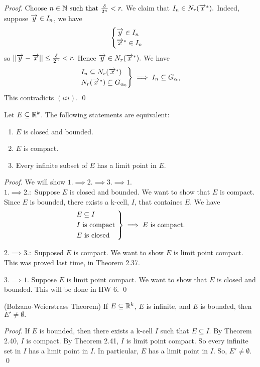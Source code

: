 \begin{proof}
		Choose $n\in \mathbb{N} \text{ such that } \frac{\delta}{2^n} < r.$ We claim that $I_n \in N_{r}(\overrightarrow{x}^*).$ Indeed,
		suppose $\overrightarrow{y}\in I_n$, we have $$\begin{cases}
			\overrightarrow{y}\in I_n \\
			\overrightarrow{x}^* \in I_n
		\end{cases}$$
		so $||\overrightarrow{y} - \overrightarrow{x}|| \leq \frac{\delta}{2^n} < r.$ Hence $\overrightarrow{y} \in N_{r}(\overrightarrow{x}^*).$ We have
		$$\begin{rcases}
			I_n \subseteq N_{r}(\overrightarrow{x}^*) \\
			N_{r}(\overrightarrow{x}^*) \subseteq G_{\alpha_0}
		\end{rcases}
		\implies I_n \subseteq G_{\alpha_0}$$
		This contradicts $(iii)$. \qed
	\end{proof}

	\begin{theorem}
		Let $E\subseteq \mathbb{R}^k$. The following statements are equivalent:
		\begin{enumerate}
			\item $E$ is closed and bounded.
			\item $E$ is compact.
			\item Every infinite subset of $E$ has a limit point in $E$.
		\end{enumerate}
	\end{theorem}
	\begin{proof}
		We will show $1. \implies 2. \implies 3. \implies 1.$ \\
		$1. \implies 2.:$ Suppose $E$ is closed and bounded. We want to show that $E$ is compact. Since $E$ is bounded,
		there exists a k-cell, $I$, that containes $E$. We have
		$$\begin{rcases}
			E \subseteq I \\
			I \text{ is compact } \\
			E \text{ is closed }
		\end{rcases}
		\implies E \text{ is compact.}$$

		$2. \implies 3.:$ Supposed $E$ is compact. We want to show $E$ is limit point compact. This was proved last time, in Theorem 2.37. $$$$

		$3. \implies 1.$ Suppose $E$ is limit point compact. We want to show that $E$ is closed and bounded. This will be done in HW 6.
		\qed
	\end{proof}

	\begin{theorem}(Bolzano-Weierstrass Theorem)
		If $E\subseteq \mathbb{R}^k$, $E$ is infinite, and $E$ is bounded, then $E'\not = \emptyset.$
	\end{theorem}
	
	\begin{proof}
		If $E$ is bounded, then there exists a k-cell $I$ such that $E\subseteq I$. By Theorem 2.40, $I$ is compact. By Theorem 2.41, $I$ is
		limit point compact. So every infinite set in $I$ has a limit point in $I$. In particular, $E$ has a limit point in $I$. So, $E' \not = \emptyset$.
		\qed
	\end{proof}
%